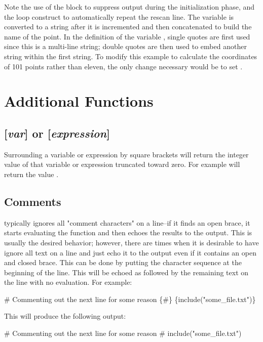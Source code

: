 Note the use of the  block to
suppress output during the initialization phase, and the loop construct
to automatically repeat the rescan line. The variable  is converted
to a string after it is incremented and then concatenated to build the name of
the point. In the definition of the variable , single quotes are first
used since this is a multi-line string; double quotes are then used to embed another
string within the first string. To modify this example to calculate the coordinates
of 101 points rather than eleven, the only change necessary would be to set .

\section{Additional Functions }

\subsection{[{\em var}] or [{\em expression}]} Surrounding a variable or expression
by square brackets will return the integer value of that variable or
expression truncated toward zero. For example \cmd{[sqrt(2)]} will return the value
.

\subsection{Comments}\label{sec:comments}
\aprepro{} typically ignores all "comment characters" on a line--if it finds an open brace, it starts evaluating the function and then echoes the results to the output.  This is usually the desired behavior; however, there are times when it is desirable to have \aprepro{} ignore all text on a line and just echo it to the output even if it contains an open and closed brace.  This can be done by putting the character sequence \cmd{\{\#\}} at the beginning of the line.  This will be echoed as \cmd{\#} followed by the remaining text on the line with no evaluation.  For example:
\begin{apinp}
# Commenting out the next line for some reason
\{#\} \{include("some_file.txt")\}
\end{apinp}

This will produce the following output:
\begin{apout}
# Commenting out the next line for some reason
# {include("some_file.txt")}
\end{apout}

